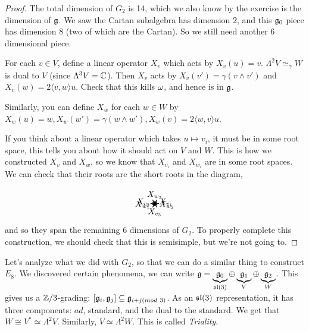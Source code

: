 \begin{proof}


   The total dimension of $G_2$ is 14, which we also know by the exercise is the
   dimension of $\g$. We saw the Cartan subalgebra has dimension 2, and this $\g_0$
   piece has dimension 8 (two of which are the Cartan). So we still need another 6
   dimensional piece.

   For each $v\in V$, define a linear operator $X_v$ which acts by $X_v(u)=v$.
   $\Lambda^2 V\simeq_\gamma W$ is dual to $V$ (since $\Lambda^3 V=\CC$). Then $X_v$
   acts by $X_v(v')= \gamma(v\wedge v')$ and $X_v(w)=2\langle v,w\rangle u$. Check
   that this kills $\w$, and hence is in $\g$.

   Similarly, you can define $X_w$ for each $w\in W$ by $X_w(u)=w,
   X_w(w')=\gamma(w\wedge w'), X_w(v) = 2\langle w,v\rangle u$.

   If you think about a linear operator which takes $u\mapsto v_i$, it must be
   in some root space, this tells you about how it should act
   on $V$ and $W$. This is how we constructed $X_v$ and $X_w$, so we know that
   $X_{v_i}$ and $X_{w_i}$ are in some root spaces. We can check that their roots
   are the short roots in the diagram,

   \[\begin{xy}
   (0,0);(0,0);
   \ar a(30) ="a" *+!L{X_{v_1}},
   \ar a(150)-"a"="b",
   \ar "b"+"a" *+!R{X_{v_2}},
   \ar "b"+"a"+"a" *+!D{X_{w_3}},
   \ar "b"+"a"+"a"+"a",
   \ar "b"+"b"+"a"+"a"+"a",
   \ar -"a" *+!R{X_{w_1}},
   \ar -"b",
   \ar -"b"-"a" *+!L{X_{w_2}},
   \ar -"b"-"a"-"a" *+!U{X_{v_3}},
   \ar -"b"-"a"-"a"-"a",
   \ar -"b"-"b"-"a"-"a"-"a",
 \end{xy}\]
   and so they span the remaining 6 dimensions of $G_2$.
   To properly complete this construction, we should check that this is
   semisimple, but we're not going to.
 \end{proof}

 Let's analyze what we did with $G_2$, so that we can do a similar thing to construct $E_8$.
 We discovered certain phenomena,
 we can write $\g = \underbrace{\g_0}_{\sl(3)}\oplus \underbrace{\g_1}_V\oplus
 \underbrace{\g_2}_W$. This gives us a $\ZZ/3$-grading: $[\g_i,\g_j]\subseteq
 \g_{i+j (mod\ 3)}$. As an $\sl(3)$ representation, it has three components: $ad$, standard,
 and the dual to the standard. We get that $W\cong V^*\simeq \Lambda^2 V$. Similarly,
 $V\simeq \Lambda^2 W$. This is called \emph{Triality}.

